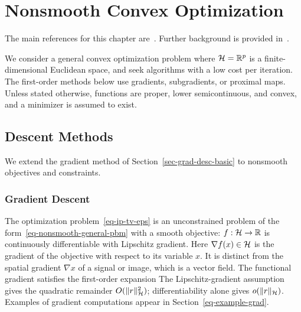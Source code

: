 
\chapter{Nonsmooth Convex Optimization}
\label{chap-conv-duality}


The main references for this chapter are~\cite{chambolle2010introduction,chambolle2016introduction,boyd2004convex}. Further background is provided in~\cite{parikh2014proximal,boyd2011distributed,beck2014introduction}.

We consider a general convex optimization problem
where $\mathcal{H}=\mathbb{R}^p$ is a finite-dimensional Euclidean space,
and seek algorithms with a low cost per iteration. The first-order methods below use gradients, subgradients, or proximal maps. Unless stated otherwise, functions are proper, lower semicontinuous, and convex, and a minimizer is assumed to exist.


\section{Descent Methods}
\label{sec-grad-descent}

We extend the gradient method of Section~\ref{sec-grad-desc-basic} to nonsmooth objectives and constraints.

\subsection{Gradient Descent}

The optimization problem~\eqref{eq-ip-tv-eps} is an unconstrained problem of the form~\eqref{eq-nonsmooth-general-pbm} with a smooth objective: $f : \mathcal{H} \rightarrow \mathbb{R}$ is continuously differentiable with Lipschitz gradient. Here $\nabla f(x)\in\mathcal{H}$ is the gradient of the objective with respect to its variable $x$. It is distinct from the spatial gradient $\nabla x$ of a signal or image, which is a vector field. The functional gradient satisfies the first-order expansion
The Lipschitz-gradient assumption gives the quadratic remainder $O(\lVert r\rVert_{\mathcal{H}}^2)$; differentiability alone gives $o(\lVert r\rVert_{\mathcal{H}})$. Examples of gradient computations appear in Section~\ref{eq-example-grad}.

